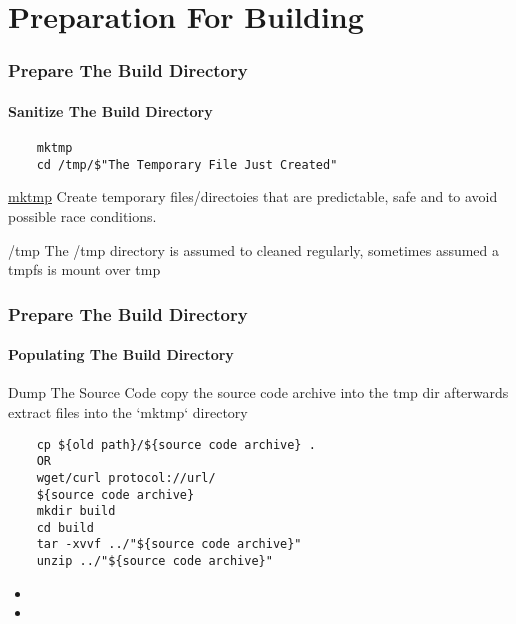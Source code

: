 \documentclass[12pt,hyperref={pdfpagelabels=true}]{beamer}
\begin{document}
\section{Preparation For Building}

\begin{frame}[fragile]
  \frametitle{Prepare The Build Directory}
  \framesubtitle{Sanitize The Build Directory}
  \lstset{language=sh}
  \begin{lstlisting}
    mktmp
    cd /tmp/$"The Temporary File Just Created"
  \end{lstlisting}
  
  \begin{alertblock}{\href{http://unixhelp.ed.ac.uk/CGI/man-cgi?mktemp}{mktmp}}
    Create temporary files/directoies that are predictable, safe and to avoid
    possible race conditions.
  \end{alertblock}
  
  \begin{alertblock}{/tmp}
    The /tmp directory is assumed to cleaned regularly, sometimes assumed a
    tmpfs is mount over tmp
  \end{alertblock}
\end{frame}

\begin{frame}[fragile]
  \frametitle{Prepare The Build Directory}
  \framesubtitle{Populating The Build Directory}
  \lstset{language=sh}
  \begin{alertblock}{Dump The Source Code}
    copy the source code archive into the tmp dir 
    afterwards extract files into the `mktmp` directory
  \end{alertblock}
  
  \begin{lstlisting}
    cp ${old path}/${source code archive} .
    OR
    wget/curl protocol://url/
    ${source code archive}
    mkdir build
    cd build
    tar -xvvf ../"${source code archive}"
    unzip ../"${source code archive}"
  \end{lstlisting}
\end{frame}

\begin{frame}
  \begin{example}
    \begin{itemize}
    \item 
    \item 
    \end{itemize}
  \end{example}
\end{frame}
\end{document}
